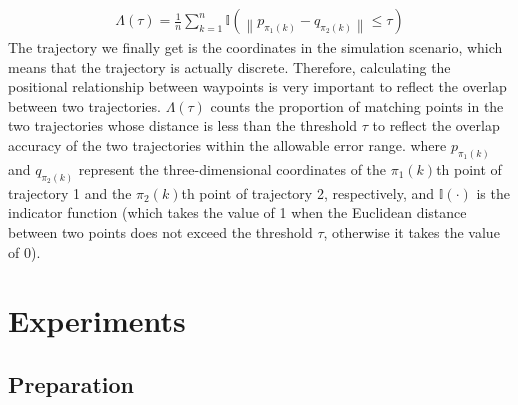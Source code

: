 \documentclass[lettersize,journal]{IEEEtran}
\begin{document}
\begin{align}
	\Lambda(\tau) = \frac{1}{n} \sum_{k=1}^{n} \mathbb{I}\left(\left\|p_{\pi_{1}(k)}-q_{\pi_{2}(k)}\right\| \leq \tau\right)
\end{align}
The trajectory we finally get is the coordinates in the simulation scenario, which means that the trajectory is actually discrete.
Therefore, calculating the positional relationship between waypoints is very important to reflect the overlap between two trajectories.
\(\Lambda(\tau)\) counts the proportion of matching points in the two trajectories whose distance is less than the threshold \(\tau\) to reflect the overlap accuracy of the two trajectories within the allowable error range.
where \(p_{\pi_{1}(k)}\) and \(q_{\pi_{2}(k)}\) represent the three-dimensional coordinates of the \(\pi_{1}(k)\)th point of trajectory 1 and the \(\pi_{2}(k)\)th point of trajectory 2, respectively, and \(\mathbb{I}(\cdot)\) is the indicator function (which takes the value of 1 when the Euclidean distance between two points does not exceed the threshold \(\tau\), otherwise it takes the value of 0).


\section{Experiments}

\subsection{Preparation}
\end{document}
